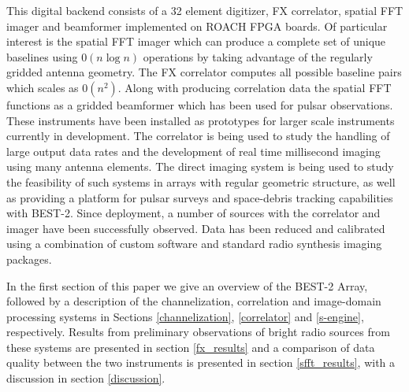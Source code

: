 \documentclass[useAMS,macros,usenatbib,onecolumn]{mn2e}
\begin{document}
This digital backend consists of a 32 element digitizer, FX correlator, spatial FFT imager and beamformer implemented on ROACH FPGA boards.
Of particular interest is the spatial FFT imager which can produce a complete set of unique baselines using $0(n \log n)$ operations by taking advantage of the regularly gridded antenna geometry.
The FX correlator computes all possible baseline pairs which scales as $0(n^2)$.
Along with producing correlation data the spatial FFT functions as a gridded beamformer which has been used for pulsar observations.
These instruments have been installed as prototypes for larger scale instruments currently in development.
The correlator is being used to study the handling of large output data rates and the development of real time millisecond imaging using many antenna elements.
The direct imaging system is being used to study the feasibility of such systems in arrays with regular geometric structure, as well as providing a platform for pulsar surveys and space-debris tracking capabilities with BEST-2.
Since deployment, a number of sources with the correlator and imager have been successfully observed.
Data has been reduced and calibrated using a combination of custom software and standard radio synthesis imaging packages.

In the first section of this paper we give an overview of the BEST-2 Array, followed by a description of the channelization, correlation and image-domain processing systems in Sections \ref{channelization}, \ref{correlator} and \ref{s-engine}, respectively.
Results from preliminary observations of bright radio sources from these systems are presented in section \ref{fx_results} and a comparison of data quality between the two instruments is presented in section \ref{sfft_results}, with a discussion in section \ref{discussion}.
\end{document}
